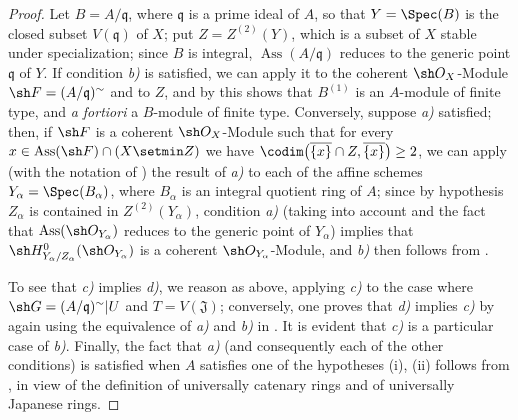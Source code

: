 \begin{proof}
Let $B=A/\mathfrak q$, where $\mathfrak q$ is a prime ideal of
$A$, so that $Y=\Spec(B)$ is the closed subset $V(\mathfrak q)$ of
$X$; put $Z=Z^{(2)}(Y)$, which is a subset of $X$ stable under
specialization; since $B$ is integral,
$\operatorname{Ass}(A/\mathfrak q)$ reduces to the generic point
$\mathfrak q$ of $Y$.  If condition \emph{b)} is satisfied, we can
apply it to the coherent $\sh O_X$-Module $\sh F=(A/\mathfrak q)^{\sim}$
and to $Z$, and by  this shows that $B^{(1)}$
is an $A$-module of finite type, and \emph{a fortiori} a $B$-module of
finite type.  Conversely, suppose \emph{a)} satisfied; then, if $\sh F$
is a coherent $\sh O_X$-Module such that for every
$x\in\operatorname{Ass}(\sh F)\cap(X\setmin Z)$ we have
$\codim\bigl(\overline{\{x\}}\cap Z,\overline{\{x\}}\bigr)\geq2$, we can
apply (with the notation of ) the result of \emph{a)}
to each of the affine schemes $Y_\alpha=\Spec(B_\alpha)$, where
$B_\alpha$ is an integral quotient ring of $A$; since by hypothesis
$Z_\alpha$ is contained in $Z^{(2)}(Y_\alpha)$, condition \emph{a)}
\textup{(}taking into account  and the fact that
$\operatorname{Ass}(\sh O_{Y_\alpha})$ reduces to the generic point of
$Y_\alpha$\textup{)} implies that
$\sh H^0_{Y_\alpha/Z_\alpha}(\sh O_{Y_\alpha})$ is a coherent
$\sh O_{Y_\alpha}$-Module, and \emph{b)} then follows from
.


To see that \emph{c)} implies \emph{d)}, we reason as above, applying
\emph{c)} to the case where $\sh G=(A/\mathfrak q)^{\sim}|U$ and
$T=V(\mathfrak J)$; conversely, one proves that \emph{d)} implies
\emph{c)} by again using the equivalence of \emph{a)} and \emph{b)} in
.  It is evident that \emph{c)} is a particular case of
\emph{b)}.  Finally, the fact that \emph{a)} \textup{(}and consequently
each of the other conditions\textup{)} is satisfied when $A$ satisfies one
of the hypotheses {\rm(i)}, {\rm(ii)} follows from , in
view of the definition of universally catenary rings and of universally
Japanese rings.
\end{proof}

